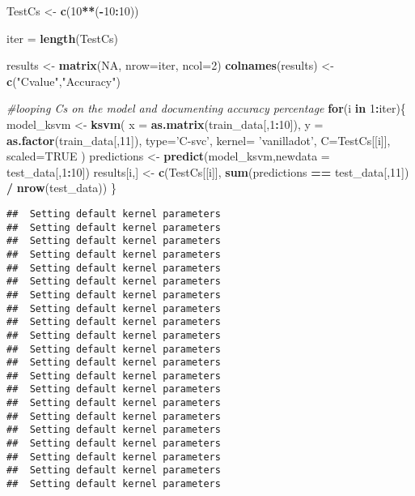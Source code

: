\documentclass[
]{article}
\newenvironment{Shaded}{\begin{snugshade}}{\end{snugshade}}
\newcommand{\CommentTok}[1]{\textcolor[rgb]{0.56,0.35,0.01}{\textit{#1}}}
\newcommand{\ControlFlowTok}[1]{\textcolor[rgb]{0.13,0.29,0.53}{\textbf{#1}}}
\newcommand{\DataTypeTok}[1]{\textcolor[rgb]{0.13,0.29,0.53}{#1}}
\newcommand{\DecValTok}[1]{\textcolor[rgb]{0.00,0.00,0.81}{#1}}
\newcommand{\KeywordTok}[1]{\textcolor[rgb]{0.13,0.29,0.53}{\textbf{#1}}}
\newcommand{\NormalTok}[1]{#1}
\newcommand{\OperatorTok}[1]{\textcolor[rgb]{0.81,0.36,0.00}{\textbf{#1}}}
\newcommand{\OtherTok}[1]{\textcolor[rgb]{0.56,0.35,0.01}{#1}}
\newcommand{\StringTok}[1]{\textcolor[rgb]{0.31,0.60,0.02}{#1}}
\begin{document}
\begin{Shaded}
\begin{Highlighting}[]
\NormalTok{TestCs <-}\StringTok{ }\KeywordTok{c}\NormalTok{(}\DecValTok{10}\OperatorTok{**}\NormalTok{(}\OperatorTok{-}\DecValTok{10}\OperatorTok{:}\DecValTok{10}\NormalTok{)) }

\NormalTok{iter =}\StringTok{ }\KeywordTok{length}\NormalTok{(TestCs)}

\NormalTok{results <-}\StringTok{ }\KeywordTok{matrix}\NormalTok{(}\OtherTok{NA}\NormalTok{, }\DataTypeTok{nrow=}\NormalTok{iter, }\DataTypeTok{ncol=}\DecValTok{2}\NormalTok{)}
\KeywordTok{colnames}\NormalTok{(results) <-}\StringTok{ }\KeywordTok{c}\NormalTok{(}\StringTok{"Cvalue"}\NormalTok{,}\StringTok{"Accuracy"}\NormalTok{)}

\CommentTok{#looping Cs on the model and documenting accuracy percentage}
\ControlFlowTok{for}\NormalTok{(i }\ControlFlowTok{in} \DecValTok{1}\OperatorTok{:}\NormalTok{iter)\{}
\NormalTok{    model_ksvm <-}\StringTok{ }\KeywordTok{ksvm}\NormalTok{( }\DataTypeTok{x =} \KeywordTok{as.matrix}\NormalTok{(train_data[,}\DecValTok{1}\OperatorTok{:}\DecValTok{10}\NormalTok{]),}
                    \DataTypeTok{y =} \KeywordTok{as.factor}\NormalTok{(train_data[,}\DecValTok{11}\NormalTok{]),}
                    \DataTypeTok{type=}\StringTok{'C-svc'}\NormalTok{,}
                    \DataTypeTok{kernel=} \StringTok{'vanilladot'}\NormalTok{,}
                    \DataTypeTok{C=}\NormalTok{TestCs[[i]], }
                    \DataTypeTok{scaled=}\OtherTok{TRUE}
\NormalTok{                    )}
\NormalTok{    predictions <-}\StringTok{ }\KeywordTok{predict}\NormalTok{(model_ksvm,}\DataTypeTok{newdata =}\NormalTok{ test_data[,}\DecValTok{1}\OperatorTok{:}\DecValTok{10}\NormalTok{])}
\NormalTok{    results[i,] <-}\StringTok{ }\KeywordTok{c}\NormalTok{(TestCs[[i]], }\KeywordTok{sum}\NormalTok{(predictions }\OperatorTok{==}\StringTok{ }\NormalTok{test_data[,}\DecValTok{11}\NormalTok{]) }\OperatorTok{/}\StringTok{ }\KeywordTok{nrow}\NormalTok{(test_data))}
\NormalTok{\}}
\end{Highlighting}
\end{Shaded}

\begin{verbatim}
##  Setting default kernel parameters  
##  Setting default kernel parameters  
##  Setting default kernel parameters  
##  Setting default kernel parameters  
##  Setting default kernel parameters  
##  Setting default kernel parameters  
##  Setting default kernel parameters  
##  Setting default kernel parameters  
##  Setting default kernel parameters  
##  Setting default kernel parameters  
##  Setting default kernel parameters  
##  Setting default kernel parameters  
##  Setting default kernel parameters  
##  Setting default kernel parameters  
##  Setting default kernel parameters  
##  Setting default kernel parameters  
##  Setting default kernel parameters  
##  Setting default kernel parameters  
##  Setting default kernel parameters  
##  Setting default kernel parameters  
##  Setting default kernel parameters
\end{verbatim}
\end{document}
